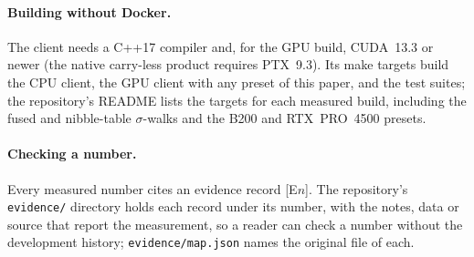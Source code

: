 \paragraph{Building without Docker.} The client needs a C++17 compiler
and, for the GPU build, CUDA~13.3 or newer (the native carry-less product
requires PTX~9.3). Its make targets build the CPU client, the GPU client
with any preset of this paper, and the test suites; the repository's
README lists the targets for each measured build, including the fused
and nibble-table $\sigma$-walks and the B200 and RTX~PRO~4500 presets.

\paragraph{Checking a number.} Every measured number cites an evidence
record [E$n$]. The repository's \texttt{evidence/} directory holds each
record under its number, with the notes, data or source that report the
measurement, so a reader can check a number without the development
history; \texttt{evidence/map.json} names the original file of each.
